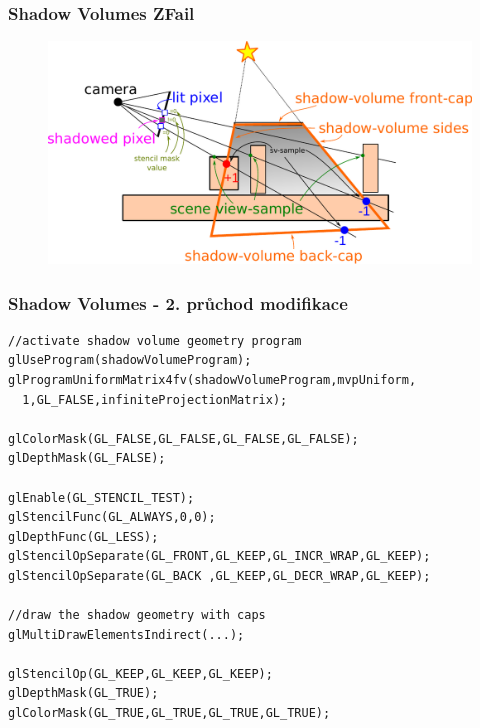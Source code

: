 \begin{frame}
  \frametitle{Shadow Volumes ZFail}
  \begin{figure}[h]
    \includegraphics[width=11.5cm,keepaspectratio]{pics/shadows/shadowVolumes/ZFail}
  \end{figure}
\end{frame}

\begin{frame}[fragile]
  \frametitle{Shadow Volumes - 2. průchod modifikace}

  \begin{verbatim}
//activate shadow volume geometry program
glUseProgram(shadowVolumeProgram);
glProgramUniformMatrix4fv(shadowVolumeProgram,mvpUniform,
  1,GL_FALSE,infiniteProjectionMatrix);

glColorMask(GL_FALSE,GL_FALSE,GL_FALSE,GL_FALSE);
glDepthMask(GL_FALSE);

glEnable(GL_STENCIL_TEST);
glStencilFunc(GL_ALWAYS,0,0);
glDepthFunc(GL_LESS);
glStencilOpSeparate(GL_FRONT,GL_KEEP,GL_INCR_WRAP,GL_KEEP);
glStencilOpSeparate(GL_BACK ,GL_KEEP,GL_DECR_WRAP,GL_KEEP);

//draw the shadow geometry with caps
glMultiDrawElementsIndirect(...);

glStencilOp(GL_KEEP,GL_KEEP,GL_KEEP);
glDepthMask(GL_TRUE);
glColorMask(GL_TRUE,GL_TRUE,GL_TRUE,GL_TRUE);
  \end{verbatim}
\end{frame}


